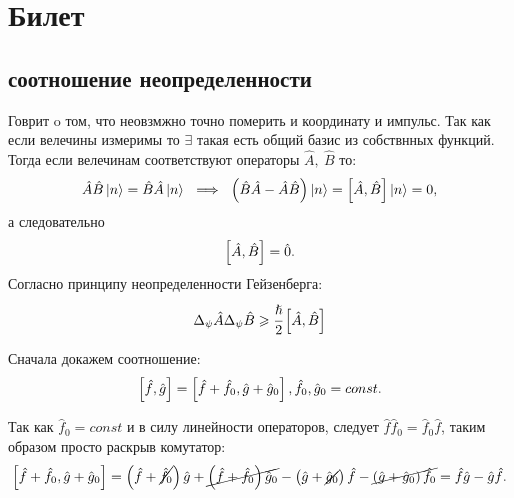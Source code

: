 \section{Билет}
\subsection{соотношение неопределенности}

Говрит o том, что неовзмжно точно померить и координату и импульс.
 Так как если велечины измеримы то $\exists$ такая есть общий базис 
 из собствнных функций. Тогда если велечинам соответствуют 
 операторы $\hat A,\ \hat B$ то:
\begin{equation*} 
 \hat A \hat B \ket{n} = \hat B \hat A  \ket{n} \ \implies\ 
 \inner{\hat B \hat A - \hat A \hat B} \ket{n} = 
 \insqr{\hat A, \hat B}\ket{n} = 0,
\end{equation*}
а следовательно 
\begin{equation} \label{eq:1}
 \left[ \hat A, \hat B \right] =\hat 0.
\end{equation} 
Согласно принципу неопределенности Гейзенберга:
\begin{equation} 
 \Delta_{\psi} \hat A \Delta_{\psi} \hat B \geqslant \cfrac{\hslash}{2}\left[ \hat A, \hat B \right]
\end{equation} 

Сначала докажем соотношение:
\begin{equation} 
  \left[ \hat f, \hat g \right] = \left[ \hat f + \hat f_0, \hat g +\hat 
  g_0 \right], \hat f_0, \hat g_0 = const.
\end{equation} 

\stp Так как $\hat f_0 = const$ и в силу линейности операторов, 
следует $\hat f \hat f_0 = \hat f_0 \hat f$, таким образом просто
раскрыв комутатор:
\begin{equation*} 
  \left[ \hat f + \hat f_0, \hat g + \hat g_0 \right] = 
  \left(  \hat f + \cancel{\hat f_0} \right) \hat g 
  + \cancel{\left( \hat f + \hat f_0 \right) \hat g_0}
  - \left( \hat g + \cancel{\hat g_0} \right)\hat f 
  - \cancel{\left( \hat g + \hat g_0 \right)\hat f_0} =
  \hat f \hat g - \hat g \hat f.
\end{equation*} 
\enp

